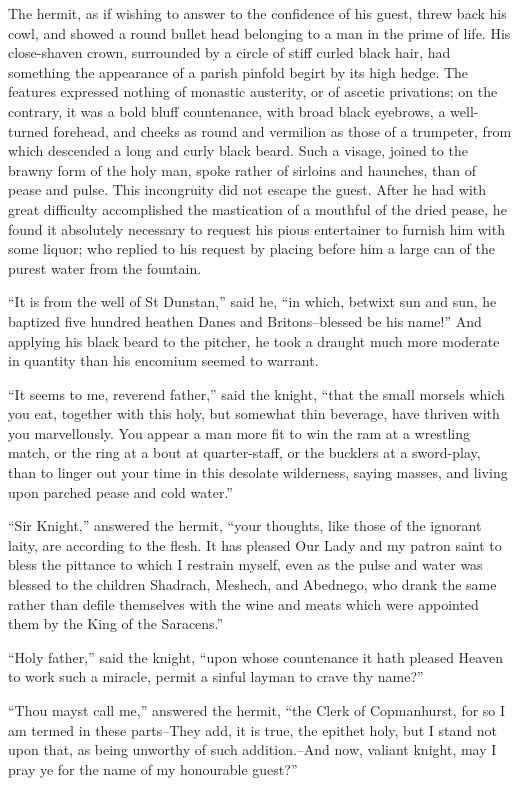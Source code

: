 The hermit, as if wishing to answer to the confidence of his guest,
threw back his cowl, and showed a round bullet head belonging to a man
in the prime of life. His close-shaven crown, surrounded by a circle of
stiff curled black hair, had something the appearance of a parish
pinfold begirt by its high hedge. The features expressed nothing of
monastic austerity, or of ascetic privations; on the contrary, it was a
bold bluff countenance, with broad black eyebrows, a well-turned
forehead, and cheeks as round and vermilion as those of a trumpeter,
from which descended a long and curly black beard. Such a visage, joined
to the brawny form of the holy man, spoke rather of sirloins and
haunches, than of pease and pulse. This incongruity did not escape the
guest. After he had with great difficulty accomplished the mastication
of a mouthful of the dried pease, he found it absolutely necessary to
request his pious entertainer to furnish him with some liquor; who
replied to his request by placing before him a large can of the purest
water from the fountain.

``It is from the well of St Dunstan,'' said he, ``in which, betwixt sun
and sun, he baptized five hundred heathen Danes and Britons--blessed be
his name!'' And applying his black beard to the pitcher, he took a
draught much more moderate in quantity than his encomium seemed to
warrant.

``It seems to me, reverend father,'' said the knight, ``that the small
morsels which you eat, together with this holy, but somewhat thin
beverage, have thriven with you marvellously. You appear a man more fit
to win the ram at a wrestling match, or the ring at a bout at
quarter-staff, or the bucklers at a sword-play, than to linger out your
time in this desolate wilderness, saying masses, and living upon parched
pease and cold water.''

``Sir Knight,'' answered the hermit, ``your thoughts, like those of the
ignorant laity, are according to the flesh. It has pleased Our Lady and
my patron saint to bless the pittance to which I restrain myself, even
as the pulse and water was blessed to the children Shadrach, Meshech,
and Abednego, who drank the same rather than defile themselves with the
wine and meats which were appointed them by the King of the Saracens.''

``Holy father,'' said the knight, ``upon whose countenance it hath
pleased Heaven to work such a miracle, permit a sinful layman to crave
thy name?''

``Thou mayst call me,'' answered the hermit, ``the Clerk of Copmanhurst,
for so I am termed in these parts--They add, it is true, the epithet
holy, but I stand not upon that, as being unworthy of such
addition.--And now, valiant knight, may I pray ye for the name of my
honourable guest?''

